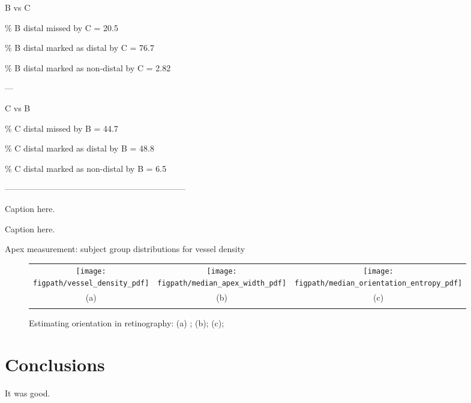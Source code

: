\documentclass[runningheads,a4paper]{llncs}
\def\figpath{./figs}
\def\figpath{./figs}
\begin{document}
B vs C

\% B distal missed by C = 20.5

\% B distal marked as distal by C = 76.7

\% B distal marked as non-distal by C = 2.82

---

C vs B

\% C distal missed by B = 44.7

\% C distal marked as distal by B = 48.8

\% C distal marked as non-distal by B = 6.5

-----------------------------------------------------------------

%
\begin{table}[tb]
\centering

%
\caption{Caption here.}
\label{t:cooccurrence}
\end{table}
% 
\begin{table}[tb]
\centering

%
\caption{Caption here.}
\label{t:cooccurrence_marginals}
\end{table}
% 

Apex measurement: subject group distributions for vessel density

%
\begin{figure}[t]
\centering
\begin{tabular}{@{}c c c@{}}
\texttt{[image: \\figpath/vessel\_density\_pdf]} &
\texttt{[image: \\figpath/median\_apex\_width\_pdf]} &
\texttt{[image: \\figpath/median\_orientation\_entropy\_pdf]} \\
(a) & (b) & (c)\\
\noalign{\smallskip}
\end{tabular}
%
\caption{Estimating orientation in retinography: %
(a) ; %
(b);%
(c);
}
\label{f:subject_apex_measures}
\end{figure}
%

\section{Conclusions}
\label{s:conclusions}
It was good.




\end{document}

